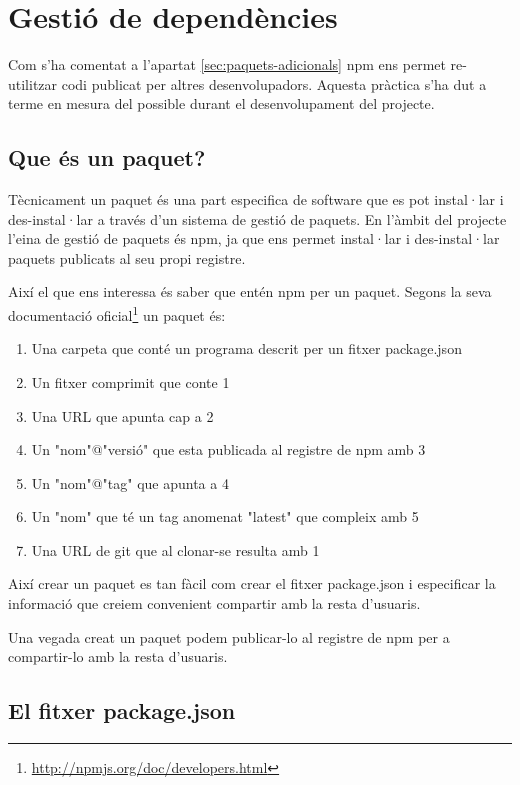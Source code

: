 \section{Gestió de dependències}
\label{sec:gestio-dependencies}
Com s'ha comentat a l'apartat \ref{sec:paquets-adicionals} npm ens permet re-utilitzar codi publicat per altres desenvolupadors. Aquesta pràctica s'ha dut a terme en mesura del possible durant el desenvolupament del projecte.  

\subsection{Que és un paquet?}
\label{sec:que-es-un-paquet}

Tècnicament un paquet és una part especifica de software que es pot instal·lar i des-instal·lar a través d'un sistema de gestió de paquets. En l'àmbit del projecte l'eina de gestió de paquets és npm, ja que ens permet instal·lar i des-instal·lar paquets publicats al seu propi registre. 

Així el que ens interessa és saber que entén npm per un paquet. Segons la seva documentació oficial\footnote{\url{http://npmjs.org/doc/developers.html}} un paquet és: 

\begin{enumerate}
\item {Una carpeta que conté un programa descrit per un fitxer package.json}
\item {Un fitxer comprimit que conte 1}
\item {Una URL que apunta cap a 2}
\item {Un "nom"@"versió" que esta publicada al registre de npm amb 3}
\item {Un "nom"@"tag" que apunta a 4}
\item {Un "nom" que té un tag anomenat "latest" que compleix amb 5}
\item {Una URL de git que al clonar-se resulta amb 1}
\end{enumerate}

Així crear un paquet es tan fàcil com crear el fitxer package.json i especificar la informació que creiem convenient compartir amb la resta d'usuaris. 

Una vegada creat un paquet podem publicar-lo al registre de npm per a compartir-lo amb la resta d'usuaris. 

\subsection{El fitxer package.json}
\label{sec:fitxer-package.json}

